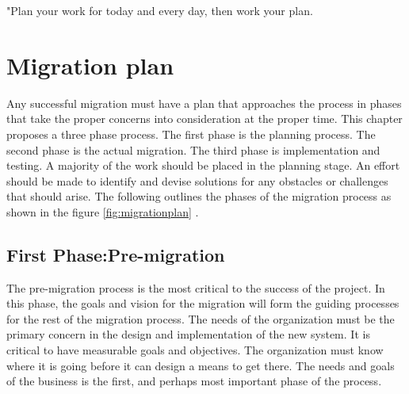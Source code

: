 \newpage
\begin{savequote}[108mm]
 "Plan your work for today and every day, then work your plan.
\end{savequote}
\chapter{Migration plan }
\label{chap:plans}
\vspace{-2cm}
 
 Any successful migration must have a plan that approaches the process in phases that take the proper concerns into consideration at the proper time. This chapter  proposes a three phase process. The first phase is the planning process. The second phase is the actual migration. The third phase is implementation and testing. A majority of the work should be placed in the planning stage. An effort should be made to identify and devise solutions for any obstacles or challenges that should arise. The following outlines the phases of the migration process as shown in the figure  \ref{fig:migrationplan} .
 \section{First Phase:Pre-migration}
 
 The pre-migration process is the most critical to the success of the project. In this phase, the goals and vision for the migration will form the guiding processes for the rest of the migration process. The needs of the organization must be the primary concern in the design and implementation of the new system. It is critical to have measurable goals and objectives. The organization must know where it is going before it can design a means to get there. The needs and goals of the business is the first, and perhaps most important phase of the process.                                                                                                                                

